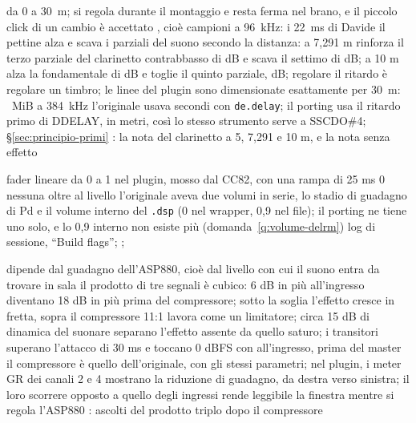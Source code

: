 {da 0 a \qty{30}{\metre}; si regola durante il montaggio e resta ferma nel brano, e il piccolo click di un cambio è accettato}
{, cioè  campioni a \qty{96}{\kilo\hertz}: i \qty{22}{\milli\second} di Davide}
{il pettine alza e scava i parziali del suono secondo la distanza: a 7,291 m rinforza il terzo parziale del clarinetto contrabbasso di  dB e scava il settimo di  dB; a 10 m alza la fondamentale di  dB e toglie il quinto parziale,  dB; regolare il ritardo è regolare un timbro; le linee del plugin sono dimensionate esattamente per \qty{30}{\metre}: ~MiB a \qty{384}{\kilo\hertz}}
{l'originale usava secondi con \texttt{de.delay}; il porting usa il ritardo primo di DDELAY, in metri, così lo stesso strumento serve a SSCDO\#4; \S\ref{sec:principio-primi}}
{\daprovare}
{: la nota del clarinetto a 5, 7,291 e 10 m, e la nota senza effetto}

{fader lineare da 0 a 1 nel plugin, mosso dal CC82, con una rampa di 25 ms}
{0}
{nessuna oltre al livello}
{l'originale aveva due volumi in serie, lo stadio di guadagno di Pd e il volume interno del \texttt{.dsp} (0 nel wrapper, 0,9 nel file); il porting ne tiene uno solo, e lo 0,9 interno non esiste più (domanda~\ref{q:volume-delrm})}
{\deciso}
{log di sessione, ``Build flags''; ; }

{dipende dal guadagno dell'ASP880, cioè dal livello con cui il suono entra}
{da trovare in sala}
{il prodotto di tre segnali è cubico: 6 dB in più all'ingresso diventano 18 dB in più prima del compressore; sotto la soglia l'effetto cresce in fretta, sopra il compressore 11:1 lavora come un limitatore; circa 15 dB di dinamica del suonare separano l'effetto assente da quello saturo; i transitori superano l'attacco di 30 ms e toccano 0 dBFS con  all'ingresso, prima del master}
{il compressore è quello dell'originale, con gli stessi parametri; nel plugin, i meter GR dei canali 2 e 4 mostrano la riduzione di guadagno, da destra verso sinistra; il loro scorrere opposto a quello degli ingressi rende leggibile la finestra mentre si regola l'ASP880}
{\daprovare}
{: ascolti del prodotto triplo dopo il compressore}

